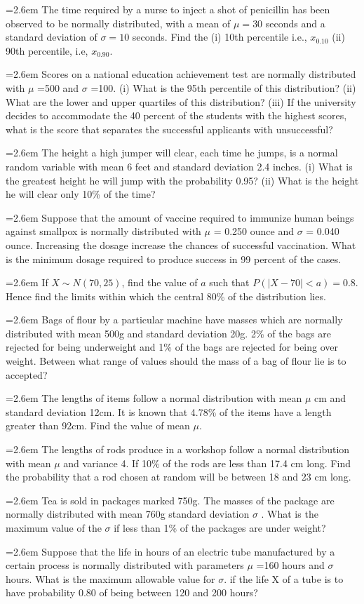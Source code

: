 \documentclass[11pt,a4paper]{article}
\newcommand{\Q}[2]{\par\smallskip\noindent\hangindent=2.6em\hangafter=1
  \makebox[2.6em][l]{\textbf{#1.}}#2\par}
\begin{document}
\Q{12}{The time required by a nurse to inject a shot of penicillin has been observed to be normally distributed, with a mean of $\mu=30$ seconds and a standard deviation of $\sigma=10$ seconds. Find the (i) 10th percentile i.e., $x_{0.10}$ (ii) 90th percentile, i.e, $x_{0.90}$.}
\Q{13}{Scores on a national education achievement test are normally distributed with $\mu$ =500 and $\sigma$ =100. (i) What is the 95th percentile of this distribution? (ii) What are the lower and upper quartiles of this distribution? (iii) If the university decides to accommodate the 40 percent of the students with the highest scores, what is the score that separates the successful applicants with unsuccessful?}
\Q{14}{The height a high jumper will clear, each time he jumps, is a normal random variable with mean 6 feet and standard deviation 2.4 inches. (i) What is the greatest height he will jump with the probability 0.95? (ii) What is the height he will clear only 10\% of the time?}
\Q{15}{Suppose that the amount of vaccine required to immunize human beings against smallpox is normally distributed with $\mu$ = 0.250 ounce and $\sigma$ = 0.040 ounce. Increasing the dosage increase the chances of successful vaccination. What is the minimum dosage required to produce success in 99 percent of the cases.}
\Q{16}{If $X\sim N(70,25)$, find the value of $a$ such that $P(|X-70|<a)=0.8$. Hence find the limits within which the central 80\% of the distribution lies.}
\Q{17}{Bags of flour by a particular machine have masses which are normally distributed with mean 500g and standard deviation 20g. 2\% of the bags are rejected for being underweight and 1\% of the bags are rejected for being over weight. Between what range of values should the mass of a bag of flour lie is to accepted?}
\Q{18}{The lengths of items follow a normal distribution with mean $\mu$ cm and standard deviation 12cm. It is known that 4.78\% of the items have a length greater than 92cm. Find the value of mean $\mu$.}
\Q{19}{The lengths of rods produce in a workshop follow a normal distribution with mean $\mu$ and variance 4. If 10\% of the rods are less than 17.4 cm long. Find the probability that a rod chosen at random will be between 18 and 23 cm long.}
\Q{20}{Tea is sold in packages marked 750g. The masses of the package are normally distributed with mean 760g standard deviation $\sigma$ . What is the maximum value of the $\sigma$ if less than 1\% of the packages are under weight?}
\Q{21}{Suppose that the life in hours of an electric tube manufactured by a certain process is normally distributed with parameters $\mu$ =160 hours and $\sigma$ hours. What is the maximum allowable value for $\sigma$. if the life X of a tube is to have probability 0.80 of being between 120 and 200 hours?}
\end{document}
